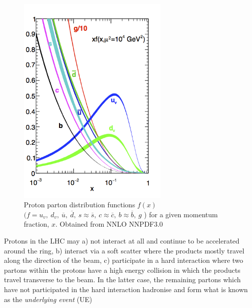 \begin{figure}[ht!]
\begin{center}
    \includegraphics[width=0.65\textwidth]{images/Theory/pdfnob.png}
    \caption{Proton parton distribution functions $f(x)$ $(f = u_{v},~ d_{v},~ \overline{u},~ \overline{d},~ s\approx\overline{s},~ c\approx\overline{c},~ b\approx\overline{b},~ g$ ) for a given momentum fraction, $x$. Obtained from NNLO NNPDF3.0~\cite{Ball2015}}
    \label{fig:protonPDF}
\end{center}
\end{figure}

Protons in the LHC may a) not interact at all and continue to be accelerated around the ring, b) interact via a soft scatter where the products mostly travel along the direction of the beam, c) participate in a hard interaction where two partons within the protons have a high energy collision in which the products travel transverse to the beam. In the latter case, the remaining partons which have not participated in the hard interaction hadronise and form what is known as the \emph{underlying event} (UE)

